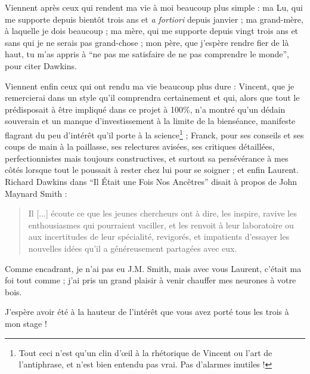 Viennent après ceux qui rendent ma vie à moi beaucoup plus simple : ma Lu, qui
me supporte depuis bientôt trois ans et \emph{a fortiori} depuis janvier ; ma
grand-mère, à laquelle je dois beaucoup ; ma mère, qui me supporte depuis vingt
trois ans et sans qui je ne serais pas grand-chose ; mon père, que j'espère
rendre fier de là haut, tu m'as appris à ``ne pas me satisfaire de ne pas
comprendre le monde'', pour citer Dawkins.

Viennent enfin ceux qui ont rendu ma vie beaucoup plus dure : Vincent, que je
remercierai dans un style qu'il comprendra certainement et qui, alors que tout
le prédisposait à être impliqué dans ce projet à 100\%, n'a montré qu'un dédain
souverain et un manque d'investissement à la limite de la bienséance, manifeste
flagrant du peu d'intérêt qu'il porte à la science\footnote{Tout ceci n'est
  qu'un clin d'œil à la rhétorique de Vincent ou l'art de l'antiphrase, et n'est
  bien entendu pas vrai. Pas d'alarmes inutiles ! } ; Franck, pour ses conseils
et ses coups de main à la paillasse, ses relectures avisées, ses critiques
détaillées, perfectionnistes mais toujours constructives, et surtout sa
persévérance à mes côtés lorsque tout le poussait à rester chez lui pour se
soigner ; et enfin Laurent. Richard Dawkins dans ``Il Était une Fois Nos
Ancêtres'' disait à propos de John Maynard Smith :

\begin{quote}
  Il [...] écoute ce que les jeunes chercheurs ont à dire, les inspire, ravive
  les enthousiasmes qui pourraient vaciller, et les renvoit à leur laboratoire
  ou aux incertitudes de leur spécialité, revigorés, et impatients d'essayer les
  nouvelles idées qu'il a généreusement partagées avec eux.
\end{quote}

Comme encadrant, je n'ai pas eu J.M. Smith, mais avec vous Laurent, c'était ma
foi tout comme ; j'ai pris un grand plaisir à venir chauffer mes neurones à
votre bois.

J'espère avoir été à la hauteur de l'intérêt que vous avez porté tous les trois
à mon stage !


\newpage


\printacronyms[include-classes=abbrev,name=Abbréviations]
\listoffigures
\listoftables

\newpage
\null
\vfill

\tableofcontents
{}
\vfill

\blankpage
\blankpage
\clearpage

\setcounter{page}{1}

\sffamily

